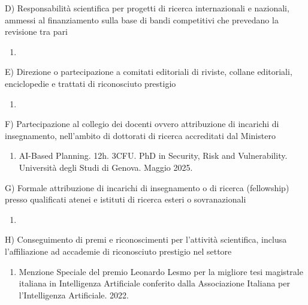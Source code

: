 \documentclass{resume} %
\begin{document}
\begin{rSectionLower}{D) Responsabilità scientifica per progetti di ricerca internazionali e nazionali, ammessi al finanziamento sulla base di bandi competitivi che prevedano la revisione tra pari}
	\begin{enumerate}
		\item 
	\end{enumerate}
\end{rSectionLower}

\begin{rSectionLower}{E) Direzione o partecipazione a comitati editoriali di riviste, collane editoriali, enciclopedie e trattati di riconosciuto prestigio}
	\begin{enumerate}
		\item 
	\end{enumerate}
\end{rSectionLower}

\begin{rSectionLower}{F) Partecipazione al collegio dei docenti ovvero attribuzione di incarichi di insegnamento, nell'ambito di dottorati di ricerca accreditati dal Ministero}
	\begin{enumerate}
		\item AI-Based Planning. 12h. 3CFU. PhD in Security, Risk and Vulnerability. Università degli Studi di Genova. Maggio 2025.
	\end{enumerate}
\end{rSectionLower}

\begin{rSectionLower}{G) Formale attribuzione di incarichi di insegnamento o di ricerca (fellowship) presso qualificati atenei e istituti di ricerca esteri o sovranazionali}
	\begin{enumerate}
		\item 
	\end{enumerate}
\end{rSectionLower}

\begin{rSectionLower}{H) Conseguimento di premi e riconoscimenti per l'attività scientifica, inclusa l’affiliazione ad accademie di riconosciuto prestigio nel settore}
	\begin{enumerate}
		\item Menzione Speciale del premio Leonardo Lesmo per la migliore tesi magistrale italiana in Intelligenza Artificiale conferito dalla Associazione Italiana per l'Intelligenza Artificiale. 2022.
	\end{enumerate}
\end{rSectionLower}
\end{document}
